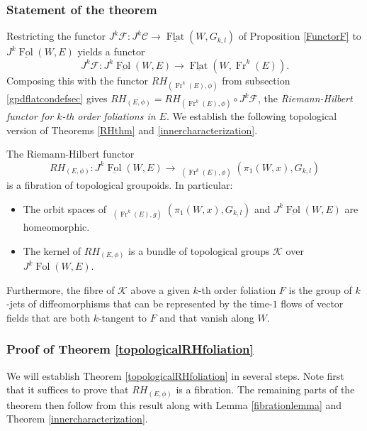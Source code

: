 \documentclass[10pt]{amsart}
\newcommand{\F}{{\mathcal{F}}}
\newcommand{\FolCat}{{\underline{\operatorname{Fol}}}}
\newcommand{\FolObj}{{\operatorname{Fol}}}
\newcommand{\FlatCat}{{\underline{\operatorname{Flat}}}}
\DeclareMathOperator{\Rep}{\underline{\operatorname{Rep}}}
\newcommand{\Fr}{{\operatorname{Fr}}}
\numberwithin{theoremalpha}{section}
\numberwithin{equation}{section}
\numberwithin{definition}{section}
\numberwithin{theorem}{section}
\numberwithin{proposition}{section}
\numberwithin{lemma}{section}
\numberwithin{example}{section}
\numberwithin{remark}{section}
\numberwithin{corollary}{section}
\numberwithin{question}{section}
\numberwithin{problem}{section}
\numberwithin{assumption}{section}
\theoremstyle{named}
\numberwithin{equation}{section}
\begin{document}
\subsubsection{Statement of the theorem}
Restricting the functor $J^k\F: J^k\mathcal{C} \to \FlatCat(W,G_{k,l})$ of Proposition \ref{FunctorF} to $J^{k}\FolCat(W,E)$ yields a functor 
\[ J^k\F: J^{k}\FolCat(W,E) \to \FlatCat(W, \Fr^{k}(E)). \]
Composing this with the functor $RH_{(\Fr^{k}(E), \phi)}$ from subsection \ref{gpdflatcondefsec} gives $RH_{(E, \phi)} = RH_{(\Fr^{k}(E), \phi)} \circ J^k\F$, the \emph{Riemann-Hilbert functor for $k$-th order foliations in $E$}. We establish the following topological version of Theorems \ref{RHthm} and \ref{innercharacterization}.
\begin{theorem} \label{topologicalRHfoliation}
The Riemann-Hilbert functor 
\[ RH_{(E, \phi)} : J^{k}\FolCat(W,E) \to \Rep_{(\Fr^k(E),\phi)}(\pi_{1}(W, x), G_{k,l}) \]
is a fibration of topological groupoids. In particular:
\begin{itemize}
\item The orbit spaces of $\Rep_{(\Fr^k(E),g)}(\pi_{1}(W, x), G_{k,l})$ and $J^{k}\FolCat(W,E)$ are homeomorphic.
\item The kernel of $RH_{(E, \phi)}$ is a bundle of topological groups $\mathcal{K}$ over $J^{k}\FolObj(W,E)$. 
\end{itemize}
Furthermore, the fibre of $\mathcal{K}$ above a given $k$-th order foliation $F$ is the group of $k$-jets of diffeomorphisms that can be represented by the time-$1$ flows of vector fields that are both $k$-tangent to $F$ and that vanish along $W$. 
\end{theorem}

\subsubsection{Proof of Theorem \ref{topologicalRHfoliation}}
We will establish Theorem \ref{topologicalRHfoliation} in several steps. Note first that it suffices to prove that $RH_{(E, \phi)}$ is a fibration. The remaining parts of the theorem then follow from this result along with Lemma \ref{fibrationlemma} and Theorem \ref{innercharacterization}. 
\end{document}
